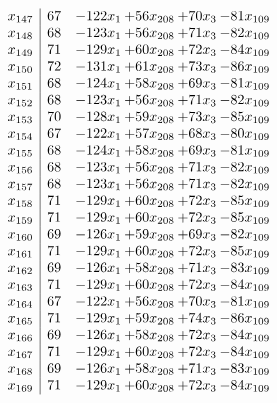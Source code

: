 \documentclass[11pt]{article}
\begin{document}
\[\begin{array}{c| c c@{\hskip 2pt} c@{\hskip 2pt} c@{\hskip 2pt} c@{\hskip 2pt} }
 x_{147}   &  67 & -122 x_{1} & + 56 x_{208} & + 70 x_{3} & -81 x_{109}\\
 x_{148}   &  68 & -123 x_{1} & + 56 x_{208} & + 71 x_{3} & -82 x_{109}\\
 x_{149}   &  71 & -129 x_{1} & + 60 x_{208} & + 72 x_{3} & -84 x_{109}\\
 x_{150}   &  72 & -131 x_{1} & + 61 x_{208} & + 73 x_{3} & -86 x_{109}\\
 x_{151}   &  68 & -124 x_{1} & + 58 x_{208} & + 69 x_{3} & -81 x_{109}\\
 x_{152}   &  68 & -123 x_{1} & + 56 x_{208} & + 71 x_{3} & -82 x_{109}\\
 x_{153}   &  70 & -128 x_{1} & + 59 x_{208} & + 73 x_{3} & -85 x_{109}\\
 x_{154}   &  67 & -122 x_{1} & + 57 x_{208} & + 68 x_{3} & -80 x_{109}\\
 x_{155}   &  68 & -124 x_{1} & + 58 x_{208} & + 69 x_{3} & -81 x_{109}\\
 x_{156}   &  68 & -123 x_{1} & + 56 x_{208} & + 71 x_{3} & -82 x_{109}\\
 x_{157}   &  68 & -123 x_{1} & + 56 x_{208} & + 71 x_{3} & -82 x_{109}\\
 x_{158}   &  71 & -129 x_{1} & + 60 x_{208} & + 72 x_{3} & -85 x_{109}\\
 x_{159}   &  71 & -129 x_{1} & + 60 x_{208} & + 72 x_{3} & -85 x_{109}\\
 x_{160}   &  69 & -126 x_{1} & + 59 x_{208} & + 69 x_{3} & -82 x_{109}\\
 x_{161}   &  71 & -129 x_{1} & + 60 x_{208} & + 72 x_{3} & -85 x_{109}\\
 x_{162}   &  69 & -126 x_{1} & + 58 x_{208} & + 71 x_{3} & -83 x_{109}\\
 x_{163}   &  71 & -129 x_{1} & + 60 x_{208} & + 72 x_{3} & -84 x_{109}\\
 x_{164}   &  67 & -122 x_{1} & + 56 x_{208} & + 70 x_{3} & -81 x_{109}\\
 x_{165}   &  71 & -129 x_{1} & + 59 x_{208} & + 74 x_{3} & -86 x_{109}\\
 x_{166}   &  69 & -126 x_{1} & + 58 x_{208} & + 72 x_{3} & -84 x_{109}\\
 x_{167}   &  71 & -129 x_{1} & + 60 x_{208} & + 72 x_{3} & -84 x_{109}\\
 x_{168}   &  69 & -126 x_{1} & + 58 x_{208} & + 71 x_{3} & -83 x_{109}\\
 x_{169}   &  71 & -129 x_{1} & + 60 x_{208} & + 72 x_{3} & -84 x_{109}\\

\end{array}\]
\end{document}
